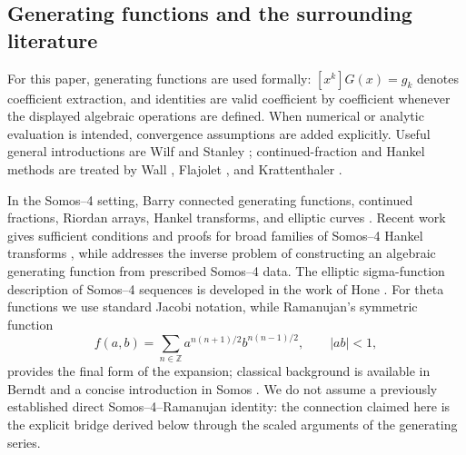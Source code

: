 \documentclass[11pt]{article}
\numberwithin{equation}{section}
\begin{document}
\subsection*{Generating functions and the surrounding literature}
For this paper, generating functions are used formally: $[x^k]G(x)=g_k$ denotes coefficient extraction, and identities are valid coefficient by coefficient whenever the displayed algebraic operations are defined.  When numerical or analytic evaluation is intended, convergence assumptions are added explicitly.  Useful general introductions are Wilf \cite{Wilf2006} and Stanley \cite{Stanley2012}; continued-fraction and Hankel methods are treated by Wall \cite{Wall1948}, Flajolet \cite{Flajolet1980}, and Krattenthaler \cite{Krattenthaler1999}.

In the Somos--4 setting, Barry connected generating functions, continued fractions, Riordan arrays, Hankel transforms, and elliptic curves \cite{Barry2018,Barry2019}.  Recent work gives sufficient conditions and proofs for broad families of Somos--4 Hankel transforms \cite{LiuWangZhang2026}, while \cite{Scheuerle2026} addresses the inverse problem of constructing an algebraic generating function from prescribed Somos--4 data.  The elliptic sigma-function description of Somos--4 sequences is developed in the work of Hone \cite{Hone2005}.  For theta functions we use standard Jacobi notation, while Ramanujan's symmetric function
\begin{equation}
f(a,b)=\sum_{n\in\mathbb Z}a^{n(n+1)/2}b^{n(n-1)/2},\qquad |ab|<1,
\end{equation}
provides the final form of the expansion; classical background is available in Berndt \cite{Berndt1991} and a concise introduction in Somos \cite{Somos2017}.  We do not assume a previously established direct Somos--4--Ramanujan identity: the connection claimed here is the explicit bridge derived below through the scaled arguments of the generating series.
\end{document}
